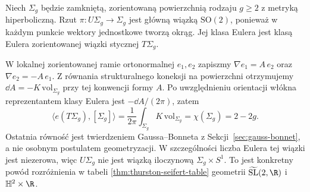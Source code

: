 \begin{przyklad}
\label{prz:thur-dop-seifert-euler}
Niech $\Sigma_g$ będzie zamkniętą, zorientowaną powierzchnią
rodzaju $g\ge2$ z metryką hiperboliczną. Rzut
$\pi:U\Sigma_g\to\Sigma_g$ jest główną wiązką
$\mathrm{SO}(2)$, ponieważ w każdym punkcie wektory
jednostkowe tworzą okrąg. Jej klasa Eulera jest klasą
Eulera zorientowanej wiązki stycznej $T\Sigma_g$.

W lokalnej zorientowanej ramie ortonormalnej $e_1,e_2$
zapiszmy $\nabla e_1=A\,e_2$ oraz
$\nabla e_2=-A\,e_1$. Z równania strukturalnego
koneksji na powierzchni otrzymujemy
$\dd A=-K\,\mathrm{vol}_{\Sigma_g}$
przy tej konwencji formy $A$. Po uwzględnieniu orientacji
włókna reprezentantem klasy Eulera jest
$-\dd A/(2\pi)$, zatem
\[
 \langle e(T\Sigma_g),[\Sigma_g]\rangle
 =\frac1{2\pi}\int_{\Sigma_g}K\,\mathrm{vol}_{\Sigma_g}
 =\chi(\Sigma_g)=2-2g.
\]
Ostatnia równość jest twierdzeniem Gaussa--Bonneta
z Sekcji~\ref{sec:gauss-bonnet}, a nie osobnym postulatem
geometryzacji. W szczególności liczba Eulera
tej wiązki jest niezerowa, więc $U\Sigma_g$ nie jest
wiązką iloczynową $\Sigma_g\times S^1$.
To jest konkretny powód rozróżnienia w tabeli
\ref{thm:thurston-seifert-table} geometrii
$\widetilde{\mathrm{SL}}(2,\R)$ i $\mathbb H^2\times\R$.
\end{przyklad}
